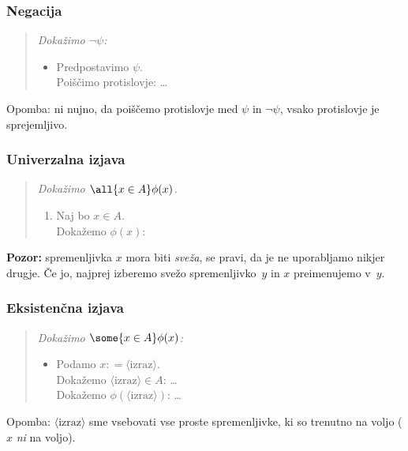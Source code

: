 \subsubsection{Negacija}

\begin{quote}
  \sl
  Dokažimo $\lnot \psi$:
  \begin{itemize}
  \item[] Predpostavimo $\psi$. \\
          Poiščimo protislovje: \quad \dots
  \end{itemize}
\end{quote}
%
Opomba: ni nujno, da poiščemo protislovje med $\psi$ in $\lnot\psi$, vsako protislovje je sprejemljivo.

\subsubsection{Univerzalna izjava}

\begin{quote}
  \sl
  Dokažimo $\all{x \in A} \phi(x)$.
  \begin{enumerate}
  \item[] Naj bo $x \in A$. \\
          Dokažemo $\phi(x)$: \quad {}
  \end{enumerate}
\end{quote}
%
\textbf{Pozor:} spremenljivka $x$ mora biti \emph{sveža}, se pravi, da je ne uporabljamo nikjer drugje. Če jo, najprej izberemo svežo spremenljivko~$y$ in $x$ preimenujemo v~$y$.

\subsubsection{Eksistenčna izjava}

\begin{quote}
  \sl
  Dokažimo $\some{x \in A} \phi(x)$:
  \begin{itemize}
  \item[] Podamo $x \mathbin{{:}{=}} \langle\text{izraz}\rangle$. \\
          Dokažemo $\langle\text{izraz}\rangle \in A$: \quad \dots \\
          Dokažemo $\phi(\langle\text{izraz}\rangle)$: \quad \dots
  \end{itemize}
\end{quote}
%
Opomba: $\langle\text{izraz}\rangle$ sme vsebovati vse proste spremenljivke, ki so trenutno na voljo ($x$ \emph{ni} na
voljo).

